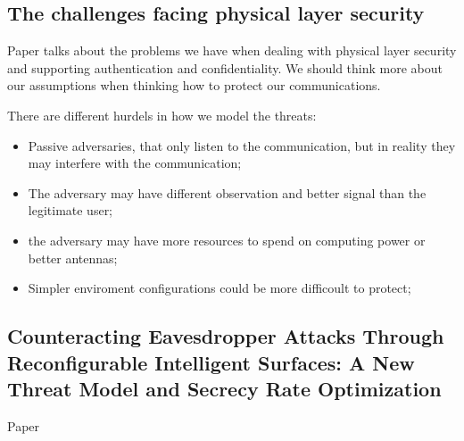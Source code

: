 \documentclass[conference]{IEEEtran}
\begin{document}
\subsection{The challenges facing physical layer security}
Paper \cite{7120011} talks about the problems we have when dealing with physical layer security and supporting authentication and confidentiality. We should think more about our assumptions when thinking how to protect our communications.

There are different hurdels in how we model the threats:
\begin{itemize}
  \item Passive adversaries, that only listen to the communication, but in reality they may interfere with the communication;
  \item The adversary may have different observation and better signal than the legitimate user;
  \item the adversary may have more resources to spend on computing power or better antennas;
  \item Simpler enviroment configurations could be more difficoult to protect;
\end{itemize}

\subsection{Counteracting Eavesdropper Attacks Through
  Reconfigurable Intelligent Surfaces: A New Threat
  Model and Secrecy Rate Optimization}
Paper \cite{10143983}

\newpage


\end{document}
